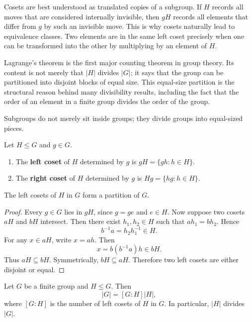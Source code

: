 Cosets are best understood as translated copies of a subgroup. If $H$ records all moves that are considered internally invisible, then $gH$ records all elements that differ from $g$ by such an invisible move. This is why cosets naturally lead to equivalence classes. Two elements are in the same left coset precisely when one can be transformed into the other by multiplying by an element of $H$.

Lagrange's theorem is the first major counting theorem in group theory. Its content is not merely that $|H|$ divides $|G|$; it says that the group can be partitioned into disjoint blocks of equal size. This equal-size partition is the structural reason behind many divisibility results, including the fact that the order of an element in a finite group divides the order of the group.

Subgroups do not merely sit inside groups; they divide groups into equal-sized pieces.

\begin{definition}[Cosets]
Let $H\leq G$ and $g\in G$.
\begin{enumerate}
    \item The \textbf{left coset} of $H$ determined by $g$ is $gH=\{gh:h\in H\}$.
    \item The \textbf{right coset} of $H$ determined by $g$ is $Hg=\{hg:h\in H\}$.
\end{enumerate}
\end{definition}

\begin{proposition}
The left cosets of $H$ in $G$ form a partition of $G$.
\end{proposition}

\begin{proof}
Every $g\in G$ lies in $gH$, since $g=ge$ and $e\in H$. Now suppose two cosets $aH$ and $bH$ intersect. Then there exist $h_1,h_2\in H$ such that $ah_1=bh_2$. Hence
\[
    b^{-1}a=h_2h_1^{-1}\in H.
\]
For any $x\in aH$, write $x=ah$. Then
\[
    x=b(b^{-1}a)h\in bH.
\]
Thus $aH\subseteq bH$. Symmetrically, $bH\subseteq aH$. Therefore two left cosets are either disjoint or equal.
\end{proof}

\begin{theorem}
Let $G$ be a finite group and $H\leq G$. Then
\[
    |G|=[G:H]|H|,
\]
where $[G:H]$ is the number of left cosets of $H$ in $G$. In particular, $|H|$ divides $|G|$.
\end{theorem}

